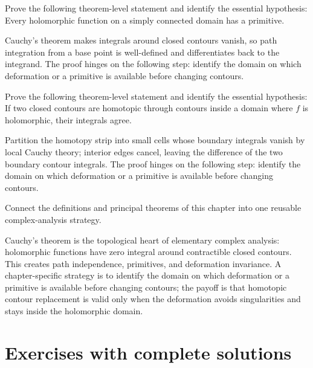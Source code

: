 \begin{problem}\label{prob:iv05-problem-10}
Prove the following theorem-level statement and identify the essential hypothesis: Every holomorphic function on a simply connected domain has a primitive.
\end{problem}
\begin{solution}
Cauchy's theorem makes integrals around closed contours vanish, so path integration from a base point is well-defined and differentiates back to the integrand. The proof hinges on the following step: identify the domain on which deformation or a primitive is available before changing contours.
\end{solution}

\begin{problem}\label{prob:iv05-problem-11}
Prove the following theorem-level statement and identify the essential hypothesis: If two closed contours are homotopic through contours inside a domain where $f$ is holomorphic, their integrals agree.
\end{problem}
\begin{solution}
Partition the homotopy strip into small cells whose boundary integrals vanish by local Cauchy theory; interior edges cancel, leaving the difference of the two boundary contour integrals. The proof hinges on the following step: identify the domain on which deformation or a primitive is available before changing contours.
\end{solution}

\begin{problem}\label{prob:iv05-problem-12}
Connect the definitions and principal theorems of this chapter into one reusable complex-analysis strategy.
\end{problem}
\begin{solution}
Cauchy's theorem is the topological heart of elementary complex analysis: holomorphic functions have zero integral around contractible closed contours. This creates path independence, primitives, and deformation invariance. A chapter-specific strategy is to identify the domain on which deformation or a primitive is available before changing contours; the payoff is that homotopic contour replacement is valid only when the deformation avoids singularities and stays inside the holomorphic domain.
\end{solution}

\section{Exercises with complete solutions}

